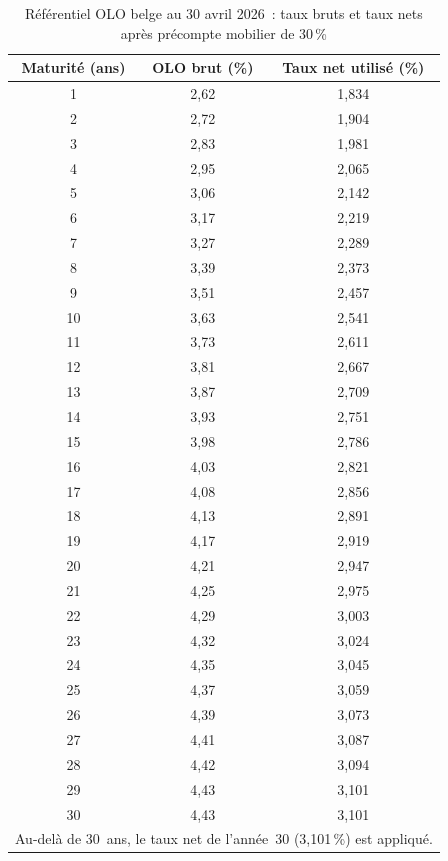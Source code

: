 ﻿\documentclass[12pt, a4paper]{article}
\begin{document}
\begin{table}[h!]
  \centering
  \caption{Référentiel OLO belge au 30 avril 2026~: taux bruts et taux nets après précompte mobilier de 30\,\%}
  \label{tab:olo_referentiel}
  \begin{tabular}{ccc}
    \hline
    \textbf{Maturité (ans)} & \textbf{OLO brut (\%)} & \textbf{Taux net utilisé (\%)} \\
    \hline
     1 & 2,62 & 1,834 \\
     2 & 2,72 & 1,904 \\
     3 & 2,83 & 1,981 \\
     4 & 2,95 & 2,065 \\
     5 & 3,06 & 2,142 \\
     6 & 3,17 & 2,219 \\
     7 & 3,27 & 2,289 \\
     8 & 3,39 & 2,373 \\
     9 & 3,51 & 2,457 \\
    10 & 3,63 & 2,541 \\
    11 & 3,73 & 2,611 \\
    12 & 3,81 & 2,667 \\
    13 & 3,87 & 2,709 \\
    14 & 3,93 & 2,751 \\
    15 & 3,98 & 2,786 \\
    16 & 4,03 & 2,821 \\
    17 & 4,08 & 2,856 \\
    18 & 4,13 & 2,891 \\
    19 & 4,17 & 2,919 \\
    20 & 4,21 & 2,947 \\
    21 & 4,25 & 2,975 \\
    22 & 4,29 & 3,003 \\
    23 & 4,32 & 3,024 \\
    24 & 4,35 & 3,045 \\
    25 & 4,37 & 3,059 \\
    26 & 4,39 & 3,073 \\
    27 & 4,41 & 3,087 \\
    28 & 4,42 & 3,094 \\
    29 & 4,43 & 3,101 \\
    30 & 4,43 & 3,101 \\
    \hline
    \multicolumn{3}{l}{\small Au-delà de 30~ans, le taux net de l'année~30 (3,101\,\%) est appliqué.} \\
    \hline
  \end{tabular}
\end{table}
\end{document}

